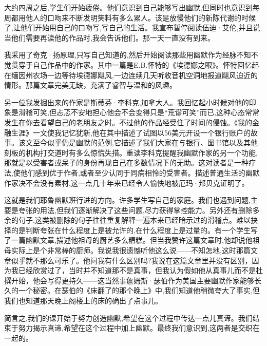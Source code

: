 大约四周之后,学生们开始疲倦。他们意识到自己能够写出幽默,但同时也意识到每周都用他人的口吻来不断发明笑料有多么累人。该是放慢他们的新陈代谢的时候了,让他们开始用自己的口吻写,写自己的生活。我宣布暂停阅读伍迪·艾伦,并且说当他们需要再读他的作品时,我会告诉他们。那一天一直没有到来。

我采用了奇克·扬原理,只写自己知道的,然后开始阅读那些用幽默作为经脉不知不觉贯穿于自己作品中的作家。其中一篇是E.B.怀特的《埃德娜之眼》。怀特回忆起在缅因州农场一边等待埃德娜飓风,一边连续几天听收音机空洞地报道飓风迫近的情形。那篇文章完美无缺，充满了睿智与温和的风趣。

另一位我发掘出来的作家是斯蒂芬·李科克,加拿大人。我回忆起小时候对他的印象是滑稽可笑,但忐忑不安地担心他会不会变得只是“荒谬可笑”而已,这种心态常常发生在你去看望自己的老朋友之时。不过他的作品经受住了时间的侵蚀。《我的金融生涯》一文使我记忆犹新,他在其中描述了试图以56美元开设一个银行账户的故事。该文至今似乎仍是幽默的范例,它描述了我们大家在与银行、图书馆以及其他刻板的机构打交道时有多么惊慌失措。重读李科克提醒我幽默作家的另一个功能,那就是以受害者或呆子的身份再现自己在多数情况下的无助。这对读者是一种疗法,使他们感到优于作者,或者至少认同于同病相怜的受害者。描述普通生活的幽默作家决不会没有素材,这一点几十年来已经令人愉快地被厄玛·邦贝克证明了。

这就是我们耶鲁幽默班行进的方向。许多学生写自己的家庭。我们也遇到问题,主要是夸张的用法,但我们逐渐解决了这些问题,尽力获得掌控能力。另外还有删除多余的句子,这类被删除的句子往往重复解释一遍本来已经暗示过的滑稽点。难以抉择的是判断夸张在什么程度上是被允许的,在什么程度上是过量的。有一个学生写了一篇幽默文章,描述他祖母的厨艺多么糟糕。但当我赞许这篇文章时,他却说他祖母实际上是个非常棒的厨师。我说我很遗憾听他这么说——不知怎地,这时那篇文章似乎就不那么可乐了。他问我有什么区别吗?我说在这篇文章里并没有区别，因为我已经欣赏过了，当时并不知道那不是真事，但我认为假如他从真事儿而不是杜撰开始，他会写得更持久——这当然事詹姆斯·瑟伯作为美国主要幽默作家能够长久的一个秘密。在瑟伯的《床翻了的那个晚上》中,我们知道他稍微夸大了事实,但我们也知道那天晚上阁楼上的床的确出了点事儿。

简言之,我们的课开始于努力创造幽默,希望在这个过程中传达一点儿真谛。我们结束于努力揭示真谛,希望在这个过程中加上幽默。最终我们意识到,这两者是交织在一起的。
